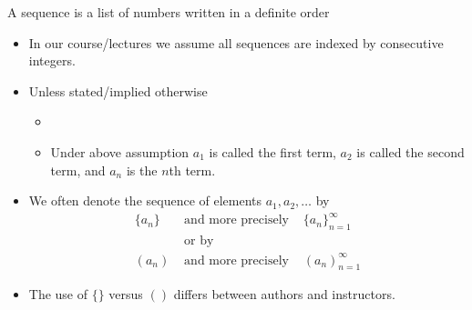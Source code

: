 \begin{frame}
\begin{definition}
A sequence is a list of numbers  written in a definite order

\end{definition}
\begin{itemize}
\item<2-> In our course/lectures we assume all sequences are indexed by consecutive integers.
\item<3-> {Unless stated/implied otherwise }
\begin{itemize}
\item<3-> 
\item<4-> Under above assumption $a_1$ is called the first term, $a_2$ is called the second term, and $a_n$ is the $n$th term.
\end{itemize}
\item<5-> We often denote the sequence of elements $a_1, a_2, \dots$ by 
\[
\begin{array}{lcl}
\{ a_n\} &\textrm{ and more precisely }& \{ a_n\}_{n = 1}^\infty\\
&\text{ or by }&\\
\left(a_n\right) &\textrm{ and more precisely }& \left( a_n\right)_{n = 1}^\infty
\end{array}
\]
\item<6-> The use of $\{\}$ versus $()$ differs between authors and instructors.
 

 
\end{itemize}

\vskip 5cm
	
\end{frame}

